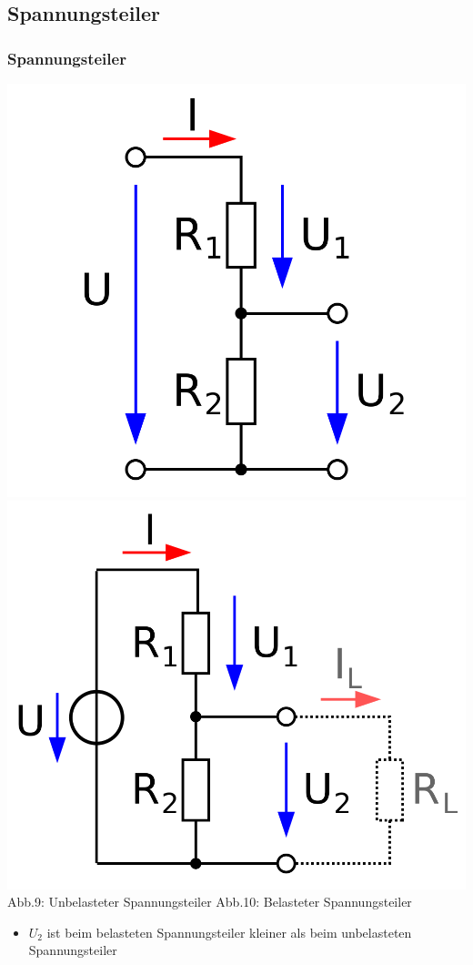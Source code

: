 \subsection{Spannungsteiler}
\begin{frame}
	\frametitle{Spannungsteiler}
	 \includegraphics[scale=0.13]{a02/spannungsteiler-unbelastet.png}
	 \hspace{2mm}
	 \includegraphics[scale=0.13]{a02/spannungsteiler-belastet.png}\\
	 	{\tiny Abb.9: Unbelasteter Spannungsteiler \cite{wp}}
	 	\hspace{10mm}
 		{\tiny Abb.10: Belasteter Spannungsteiler \cite{wp}} 
 	\begin{itemize}
 		\item $U_2$ ist beim belasteten Spannungsteiler kleiner als beim unbelasteten Spannungsteiler
	\end{itemize} 		
\end{frame}

